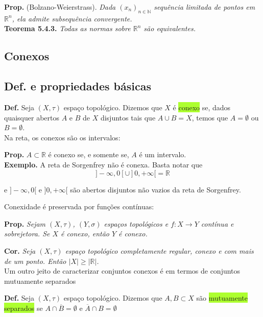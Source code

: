 \documentclass{article}
\begin{document}
\begin{landscape}
\begin{multicols}{3}
\textbf{Prop.} (Bolzano-Weierstrass). \textit{Dada $(x_n)_{n \in \mathbb{N}}$ sequência limitada de pontos em $\mathbb{R}^n$, ela admite subsequência convergente.}\\

\textbf{Teorema 5.4.3.} \textit{Todas as normas sobre $\mathbb{R}^n$ são equivalentes.}
\end{multicols}
\newpage
\begin{center}

\section{Conexos}
\end{center}
\begin{multicols}{3}
\subsection{Def. e propriedades básicas}
\textbf{Def.} Seja $(X, \tau)$ espaço topológico. Dizemos que $X$ é \colorbox{GreenYellow}{conexo} se, dados quaisquer abertos $A$ e $B$ de $X$ disjuntos tais que $A \cup B = X$, temos que $A = \emptyset$ ou $B = \emptyset$.\\

\color{blue!70} Na reta, os conexos são os intervalos:\color{black}

\textbf{Prop.} $A \subset \mathbb{R}$ é conexo se, e somente se, $A$ é um intervalo.\\

\textbf{Exemplo.} A reta de Sorgenfrey não é conexa. Basta notar que
\[
]-\infty, 0[ \cup ]0, +\infty[ = \mathbb{R}
\]

e $]-\infty, 0[$ e $]0, +\infty[$ são abertos disjuntos não vazios da reta de Sorgenfrey.

\color{blue!70} Conexidade é preservada por funções contínuas:\color{black}

\textbf{Prop.} \textit{Sejam $(X, \tau)$, $(Y, \sigma)$ espaços topológicos e $f : X \to Y$ contínua e sobrejetora. Se $X$ é conexo, então $Y$ é conexo.}

\textbf{Cor.} \textit{Seja $(X, \tau)$ espaço topológico completamente regular, conexo e com mais de um ponto. Então $|X| \geq |\mathbb{R}|$.}\\

\color{blue!70}Um outro jeito de caracterizar conjuntos conexos é em termos de conjuntos mutuamente separados\color{black}

\textbf{Def.} Seja $(X, \tau)$ espaço topológico. Dizemos que $A, B \subset X$ são \colorbox{GreenYellow}{mutuamente separados} se $A \cap \overline{B} = \emptyset$ e $\overline{A} \cap B = \emptyset$\\


\end{multicols}
\end{landscape}
\end{document}
